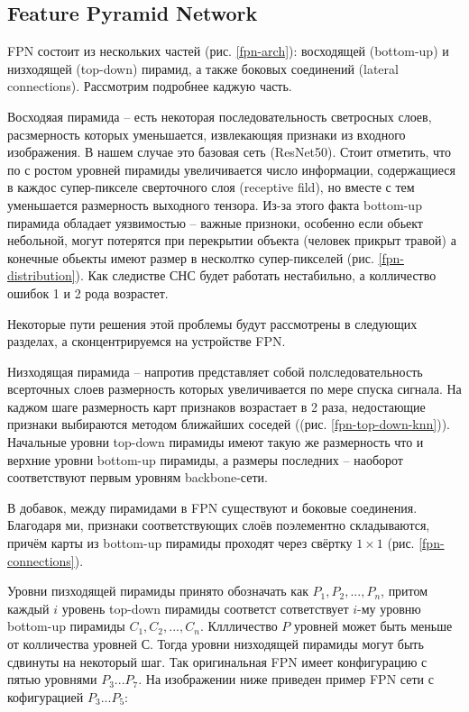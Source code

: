 \subsection{Feature Pyramid Network}

FPN состоит из нескольких частей (рис. \ref{fpn-arch}): восходящей (bottom-up) и низходящей (top-down) пирамид, а также боковых соединений (lateral connections). Рассмотрим подробнее каджую часть.


Восходяая пирамида -- есть некоторая последовательность светросных слоев, расзмерность которых уменьшается, извлекающяя признаки из входного изображения. В нашем случае это базовая сеть (ResNet50). Стоит отметить, что по с ростом уровней пирамиды увеличивается число информации, содержащиеся в каждос супер-пикселе сверточного слоя (receptive fild), но вместе с тем уменьшается размерность выходного тензора. 
Из-за этого факта bottom-up пирамида обладает уязвимостью -- важные призноки, особенно если обьект небольной, могут потерятся при перекрытии объекта (человек прикрыт травой) а конечные обьекты имеют размер в несколтко супер-пикселей (рис. \ref{fpn-distribution}). Как следистве СНС будет работать нестабильно, а колличество ошибок 1 и 2 рода возрастет. 


Некоторые пути решения этой проблемы будут рассмотрены в следующих разделах, а сконцентрируемся на устройстве FPN.

Низходящая пирамида -- напротив представляет собой полследовательность всерточных слоев размерность которых увеличивается по мере спуска сигнала. На каджом шаге размерность карт признаков возрастает в 2 раза, недостающие признаки выбираются методом ближайших соседей ((рис. \ref{fpn-top-down-knn})). Начальные уровни top-down пирамиды имеют такую же размерность что и верхние уровни bottom-up пирамиды, а размеры последних -- наоборот соответствуют первым уровням backbone-сети.


В добавок, между пирамидами в FPN существуют и боковые соединения. Благодаря ми, признаки соответствующих слоёв поэлементно складываются, причём карты из bottom-up пирамиды проходят через свёртку $1 \times 1$ (рис. \ref{fpn-connections}).


Уровни пизходящей пирамиды принято обозначать как $P_1, P_2, ..., P_n$, притом каждый $i$ уровень top-down пирамиды соответст сответствует $i$-му уровню bottom-up пирамиды $C_1, C_2, ..., C_n$. Кллличество $P$ уровней может быть меньше от колличества уровней $С$. Тогда уровни низходящей пирамиды могут быть сдвинуты на некоторый шаг. Так оригинальная FPN имеет конфигурацию с пятью уровнями $P_3...P_7$. На изображении ниже приведен пример FPN сети с кофигурацией $P_3...P_5$:

